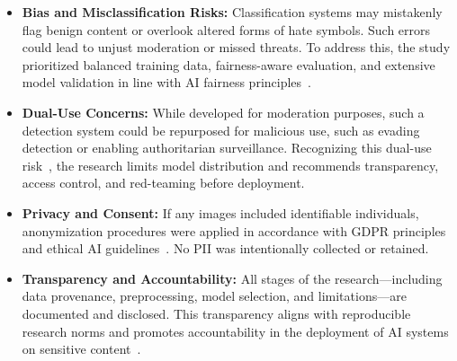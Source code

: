 \begin{itemize}
    \item \textbf{Bias and Misclassification Risks:} Classification systems may mistakenly flag benign content or
    overlook altered forms of hate symbols. Such errors could lead to unjust moderation or missed threats. To
    address this, the study prioritized balanced training data, fairness-aware evaluation, and extensive model
    validation in line with AI fairness principles~\parencite{mehrabi2021survey}.

    \item \textbf{Dual-Use Concerns:} While developed for moderation purposes, such a detection system could be
    repurposed for malicious use, such as evading detection or enabling authoritarian surveillance. Recognizing this
    dual-use risk~\parencite{brundage2018malicious}, the research limits model distribution and recommends
    transparency, access control, and red-teaming before deployment.

    \item \textbf{Privacy and Consent:} If any images included identifiable individuals, anonymization procedures
    were applied in accordance with \ac{GDPR} principles and ethical AI guidelines~\parencite{gdpr2016}. No \ac{PII}
    was intentionally collected or retained.

    \item \textbf{Transparency and Accountability:} All stages of the research—including data provenance,
    preprocessing, model selection, and limitations—are documented and disclosed. This transparency aligns with
    reproducible research norms and promotes accountability in the deployment of AI systems on sensitive
    content~\parencite{Mitchell_2019}.
\end{itemize}


